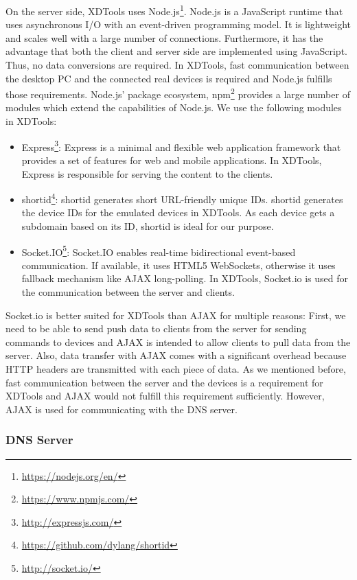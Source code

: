 On the server side, XDTools uses Node.js\footnote{\url{https://nodejs.org/en/}}. Node.js is a JavaScript runtime that uses asynchronous I/O with an event-driven programming model. It is lightweight and scales well with a large number of connections. Furthermore, it has the advantage that both the client and server side are implemented using JavaScript. Thus, no data conversions are required. In XDTools, fast communication between the desktop PC and the connected real devices is required and Node.js fulfills those requirements. Node.js' package ecosystem, npm\footnote{\url{https://www.npmjs.com/}} provides a large number of modules which extend the capabilities of Node.js. We use the following modules in XDTools: 
\begin{itemize}
	\item Express\footnote{\url{http://expressjs.com/}}: Express is a minimal and flexible web application framework that provides a set of features for web and mobile applications. In XDTools, Express is responsible for serving the content to the clients.
	\item shortid\footnote{\url{https://github.com/dylang/shortid}}: shortid generates short URL-friendly unique IDs. shortid generates the device IDs for the emulated devices in XDTools. As each device gets a subdomain based on its ID, shortid is ideal for our purpose.
	\item Socket.IO\footnote{\url{http://socket.io/}}: Socket.IO enables real-time bidirectional event-based communication. If available, it uses HTML5 WebSockets, otherwise it uses fallback mechanism like AJAX long-polling. In XDTools, Socket.io is used for the communication between the server and clients.
\end{itemize}

Socket.io is better suited for XDTools than AJAX for multiple reasons: First, we need to be able to send push data to clients from the server for sending commands to devices and AJAX is intended to allow clients to pull data from the server. Also, data transfer with AJAX comes with a significant overhead because HTTP headers are transmitted with each piece of data. As we mentioned before, fast communication between the server and the devices is a requirement for XDTools and AJAX would not fulfill this requirement sufficiently. However, AJAX is used for communicating with the DNS server.

\subsubsection{DNS Server}


